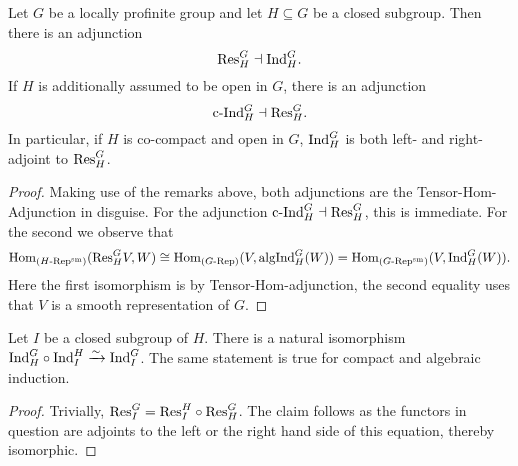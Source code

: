 \documentclass[../main.tex]{subfiles}
\begin{document}
\begin{thm}\label{thm:SmFrobRec}
  Let $G$ be a locally profinite group and let $H \subseteq G$ be a closed subgroup.
  Then there is an adjunction
  \begin{equation*}
    \mathrm{Res}_H^G \dashv \mathrm{Ind}_H^G.
  \end{equation*}
  If $H$ is additionally assumed to be open in $G$, there is an adjunction
  $$\mathrm{c\text{-}Ind}_H^G \dashv \mathrm{Res}_H^G.$$
  In particular, if $H$ is co-compact and open in $G$, $\mathrm{Ind}_H^G$ is both left-
  and right-adjoint to $\mathrm{Res}_H^G$.
\begin{proof}
  Making use of the remarks above, both adjunctions are the
  Tensor-Hom-Adjunction in disguise. For the adjunction $\mathrm{c\text{-}Ind}_H^G \dashv
  \mathrm{Res}_H^G$, this is immediate. For the second we observe that
  \begin{equation*}
    \operatorname{Hom}_{{({H}\text-\allowbreak\mathrm{Rep^{\mathrm{sm}}})}}(\mathrm{Res}_H^G V, W) \cong \operatorname{Hom}_{{({G}\text-\allowbreak\mathrm{Rep})}}(V, \mathrm{algInd}_H^G(W)) = 
    \operatorname{Hom}_{{({G}\text-\allowbreak\mathrm{Rep^{\mathrm{sm}}})}}(V, \mathrm{Ind}_H^G(W)).
  \end{equation*}
  Here the first isomorphism is by Tensor-Hom-adjunction, the second 
  equality uses that $V$ is a smooth representation of $G$.
\end{proof}
\end{thm}

\begin{prop}\label{prop:InductionOnTower}
  Let $I$ be a closed subgroup of $H$. There is a natural isomorphism $\mathrm{Ind}_H^G
  \circ \mathrm{Ind}_I^H \xrightarrow{\sim} \mathrm{Ind}_I^G$. 
  The same statement is true for compact and algebraic induction.
  \begin{proof}
    Trivially, $\mathrm{Res}_I^G = \mathrm{Res}_I^H \circ \mathrm{Res}_H^G$. The claim follows as the functors
    in question are adjoints to the left or the right hand side of this equation,
    thereby isomorphic.
  \end{proof}
\end{prop}
\end{document}
